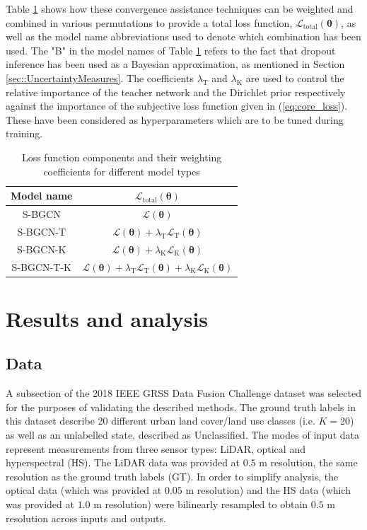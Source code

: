 \documentclass[
twocolumn,
]{ceurart}
\begin{document}
Table \ref{loss_table} shows how these convergence assistance techniques can be weighted and combined in various permutations to provide a total loss function, $\mathcal{L}_\text{total}(\boldsymbol{\theta})$, as well as the model name abbreviations used to denote which combination has been used.
The "B" in the model names of Table \ref{loss_table} refers to the fact that dropout inference has been used as a Bayesian approximation, as mentioned in Section \ref{sec::UncertaintyMeasures}.
The coefficients $\lambda_{\text{T}}$ and $\lambda_{\text{K}}$ are used to control the relative importance of the teacher network and the Dirichlet prior respectively against the importance of the subjective loss function given in (\ref{eq:core_loss}).
These have been considered as hyperparameters which are to be tuned during training.

\begin{table}[!t]
\scriptsize
\renewcommand{\arraystretch}{1.5}
\caption{Loss function components and their weighting coefficients for different model types}
\label{loss_table}
\centering
\begin{tabular}{cc}
\hline
\bfseries Model name & \bfseries $\mathcal{L}_{\text{total}}(\boldsymbol{\theta})$\\
\hline
S-BGCN & $\mathcal{L}(\boldsymbol{\theta})$ \\
S-BGCN-T & $\mathcal{L}(\boldsymbol{\theta})+\lambda_{\text{T}}\mathcal{L}_{\text{T}}(\boldsymbol{\theta})$ \\
S-BGCN-K & $\mathcal{L}(\boldsymbol{\theta})+\lambda_{\text{K}}\mathcal{L}_{\text{K}}(\boldsymbol{\theta})$ \\
S-BGCN-T-K & $\mathcal{L}(\boldsymbol{\theta})+\lambda_{\text{T}}\mathcal{L}_{\text{T}}(\boldsymbol{\theta})+\lambda_{\text{K}}\mathcal{L}_{\text{K}}(\boldsymbol{\theta})$ \\
\hline
\end{tabular}
\end{table}

\section{Results and analysis}
\label{sec::results}
\subsection{Data}
A subsection of the 2018 IEEE GRSS Data Fusion Challenge dataset was selected for the purposes of validating the described methods.
The ground truth labels in this dataset describe 20 different urban land cover/land use classes (i.e. $K=20$) as well as an unlabelled state, described as Unclassified.
The modes of input data represent measurements from three sensor types: LiDAR, optical and hyperspectral (HS).
The LiDAR data was provided at $0.5$ m resolution, the same resolution as the ground truth labels (GT).
In order to simplify analysis, the optical data (which was provided at $0.05$ m resolution) and the HS data (which was provided at $1.0$ m resolution) were bilinearly resampled to obtain $0.5$ m resolution across inputs and outputs.
\end{document}
